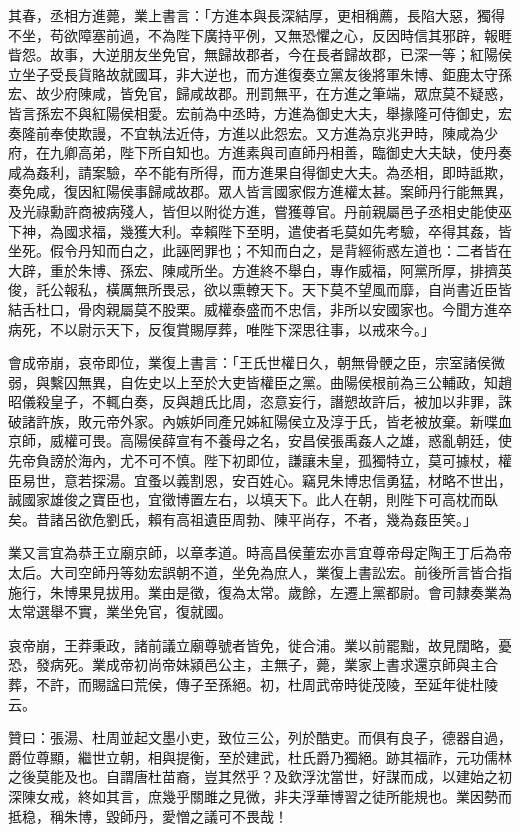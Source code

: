 \begin{pinyinscope}
其春，丞相方進薨，業上書言：「方進本與長深結厚，更相稱薦，長陷大惡，獨得不坐，苟欲障塞前過，不為陛下廣持平例，又無恐懼之心，反因時信其邪辟，報睚眥怨。故事，大逆朋友坐免官，無歸故郡者，今在長者歸故郡，已深一等；紅陽侯立坐子受長貨賂故就國耳，非大逆也，而方進復奏立黨友後將軍朱博、鉅鹿太守孫宏、故少府陳咸，皆免官，歸咸故郡。刑罰無平，在方進之筆端，眾庶莫不疑惑，皆言孫宏不與紅陽侯相愛。宏前為中丞時，方進為御史大夫，舉掾隆可侍御史，宏奏隆前奉使欺謾，不宜執法近侍，方進以此怨宏。又方進為京兆尹時，陳咸為少府，在九卿高弟，陛下所自知也。方進素與司直師丹相善，臨御史大夫缺，使丹奏咸為姦利，請案驗，卒不能有所得，而方進果自得御史大夫。為丞相，即時詆欺，奏免咸，復因紅陽侯事歸咸故郡。眾人皆言國家假方進權太甚。案師丹行能無異，及光祿勳許商被病殘人，皆但以附從方進，嘗獲尊官。丹前親屬邑子丞相史能使巫下神，為國求福，幾獲大利。幸賴陛下至明，遣使者毛莫如先考驗，卒得其姦，皆坐死。假令丹知而白之，此誣罔罪也；不知而白之，是背經術惑左道也：二者皆在大辟，重於朱博、孫宏、陳咸所坐。方進終不舉白，專作威福，阿黨所厚，排擠英俊，託公報私，橫厲無所畏忌，欲以熏轑天下。天下莫不望風而靡，自尚書近臣皆結舌杜口，骨肉親屬莫不股栗。威權泰盛而不忠信，非所以安國家也。今聞方進卒病死，不以尉示天下，反復賞賜厚葬，唯陛下深思往事，以戒來今。」

會成帝崩，哀帝即位，業復上書言：「王氏世權日久，朝無骨骾之臣，宗室諸侯微弱，與繫囚無異，自佐史以上至於大吏皆權臣之黨。曲陽侯根前為三公輔政，知趙昭儀殺皇子，不輒白奏，反與趙氏比周，恣意妄行，譖愬故許后，被加以非罪，誅破諸許族，敗元帝外家。內嫉妒同產兄姊紅陽侯立及淳于氏，皆老被放棄。新喋血京師，威權可畏。高陽侯薛宣有不養母之名，安昌侯張禹姦人之雄，惑亂朝廷，使先帝負謗於海內，尤不可不慎。陛下初即位，謙讓未皇，孤獨特立，莫可據杖，權臣易世，意若探湯。宜蚤以義割恩，安百姓心。竊見朱博忠信勇猛，材略不世出，誠國家雄俊之寶臣也，宜徵博置左右，以填天下。此人在朝，則陛下可高枕而臥矣。昔諸呂欲危劉氏，賴有高祖遺臣周勃、陳平尚存，不者，幾為姦臣笑。」

業又言宜為恭王立廟京師，以章孝道。時高昌侯董宏亦言宜尊帝母定陶王丁后為帝太后。大司空師丹等劾宏誤朝不道，坐免為庶人，業復上書訟宏。前後所言皆合指施行，朱博果見拔用。業由是徵，復為太常。歲餘，左遷上黨都尉。會司隸奏業為太常選舉不實，業坐免官，復就國。

哀帝崩，王莽秉政，諸前議立廟尊號者皆免，徙合浦。業以前罷黜，故見闊略，憂恐，發病死。業成帝初尚帝妹潁邑公主，主無子，薨，業家上書求還京師與主合葬，不許，而賜諡曰荒侯，傳子至孫絕。初，杜周武帝時徙茂陵，至延年徙杜陵云。

贊曰：張湯、杜周並起文墨小吏，致位三公，列於酷吏。而俱有良子，德器自過，爵位尊顯，繼世立朝，相與提衡，至於建武，杜氏爵乃獨絕。跡其福祚，元功儒林之後莫能及也。自謂唐杜苗裔，豈其然乎？及欽浮沈當世，好謀而成，以建始之初深陳女戒，終如其言，庶幾乎關雎之見微，非夫浮華博習之徒所能規也。業因勢而抵稳，稱朱博，毀師丹，愛憎之議可不畏哉！


\end{pinyinscope}